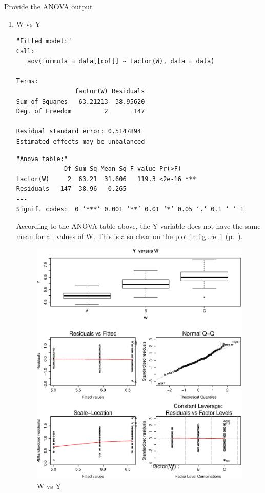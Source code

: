 \documentclass{article}
\begin{document}
\subsubsection{}
Provide the ANOVA output


\begin{enumerate}
  \item W vs Y
  \begin{lstlisting}
"Fitted model:"
Call:
   aov(formula = data[[col]] ~ factor(W), data = data)

Terms:
                factor(W) Residuals
Sum of Squares   63.21213  38.95620
Deg. of Freedom         2       147

Residual standard error: 0.5147894
Estimated effects may be unbalanced
  \end{lstlisting}
  
  \begin{lstlisting}
"Anova table:"
             Df Sum Sq Mean Sq F value Pr(>F)    
factor(W)     2  63.21  31.606   119.3 <2e-16 ***
Residuals   147  38.96   0.265                   
---
Signif. codes:  0 ‘***’ 0.001 ‘**’ 0.01 ‘*’ 0.05 ‘.’ 0.1 ‘ ’ 1
  \end{lstlisting}
  
  According to the ANOVA table above, the Y variable does not have the same mean
  for all values of W. This is also clear on the plot in figure~\ref{fig:YvsW}
  (p.~\pageref{fig:YvsW}).
  
  \begin{figure}[H]
  \centering
  \includegraphics[scale=0.6]{YvsW.eps}
  \caption{W vs Y}
  \label{fig:YvsW}
  \end{figure}


\end{enumerate}
\end{document}
